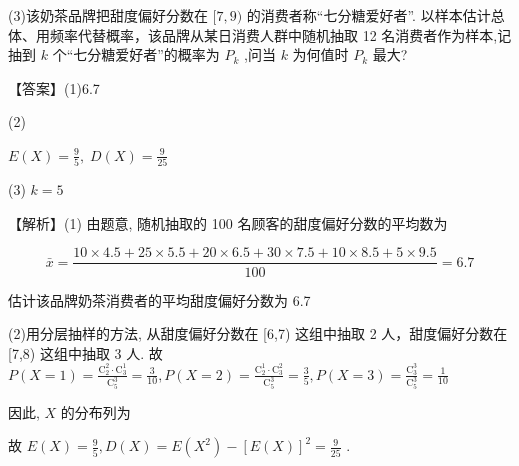 \documentclass[10pt]{article}
\begin{document}
(3)该奶茶品牌把甜度偏好分数在 \(\lbrack 7,9)\) 的消费者称“七分糖爱好者”. 以样本估计总体、用频率代替概率，该品牌从某日消费人群中随机抽取 12 名消费者作为样本,记抽到 \(k\) 个“七分糖爱好者”的概率为 \({P}_{k}\) ,问当 \(k\) 为何值时 \({P}_{k}\) 最大?

【答案】(1)6.7

(2)

\begin{center}
\end{center}

\(E\left( X\right)  = \frac{9}{5},\;D\left( X\right)  = \frac{9}{25}\)

(3) \(k = 5\)

【解析】(1) 由题意, 随机抽取的 100 名顾客的甜度偏好分数的平均数为

\[
\bar{x} = \frac{{10} \times  {4.5} + {25} \times  {5.5} + {20} \times  {6.5} + {30} \times  {7.5} + {10} \times  {8.5} + 5 \times  {9.5}}{100} = {6.7}
\]

估计该品牌奶茶消费者的平均甜度偏好分数为 6.7

(2)用分层抽样的方法, 从甜度偏好分数在 [6,7) 这组中抽取 2 人，甜度偏好分数在 [7,8) 这组中抽取 3 人. 故 \(P\left( {X = 1}\right)  = \frac{{\mathrm{C}}_{2}^{2} \cdot  {\mathrm{C}}_{3}^{1}}{{\mathrm{C}}_{5}^{3}} = \frac{3}{10},P\left( {X = 2}\right)  = \frac{{\mathrm{C}}_{2}^{1} \cdot  {\mathrm{C}}_{3}^{2}}{{\mathrm{C}}_{5}^{3}} = \frac{3}{5},P\left( {X = 3}\right)  = \frac{{\mathrm{C}}_{3}^{3}}{{\mathrm{C}}_{5}^{3}} = \frac{1}{10}\)

因此, \(X\) 的分布列为

\begin{center}
\end{center}

故 \(E\left( X\right)  = \frac{9}{5},D\left( X\right)  = E\left( {X}^{2}\right)  - {\left\lbrack  E\left( X\right) \right\rbrack  }^{2} = \frac{9}{25}\) .
\end{document}
